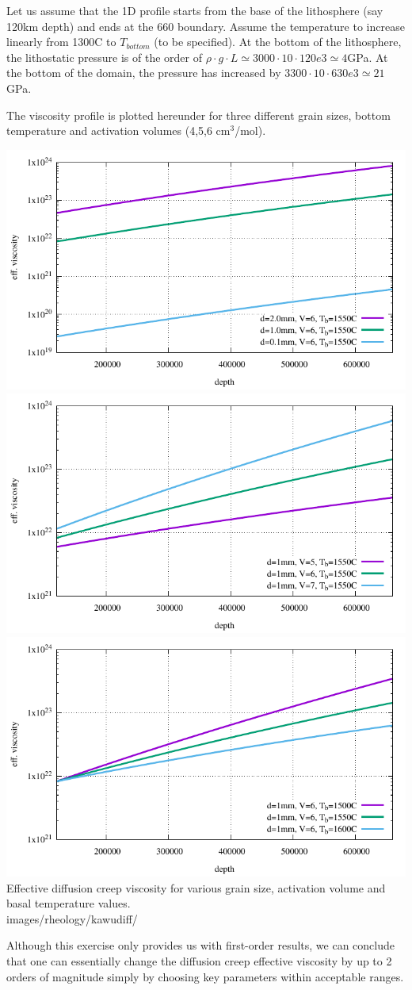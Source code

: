 Let us assume that the 1D profile starts from the base of the lithosphere 
(say 120\si{\km} depth) and ends at the 660 boundary. 
Assume the temperature to increase linearly from 1300\degree C to $T_{bottom}$ (to 
be specified). At the bottom 
of the lithosphere, the lithostatic pressure is of the order of 
$\rho \cdot g \cdot L \simeq 3000\cdot 10 \cdot 120e3 \simeq 4$\si{\giga\pascal}. 
At the bottom of the domain, the pressure has increased 
by $3300\cdot 10 \cdot 630e3 \simeq21$\si{\giga\pascal}. 

The viscosity profile is plotted hereunder for three different grain sizes, bottom temperature and 
activation volumes (4,5,6 cm$^3$/mol). 

\begin{center}
\includegraphics[width=5.cm]{images/rheology/kawudiff/viscosity1.pdf}
\includegraphics[width=5.cm]{images/rheology/kawudiff/viscosity2.pdf}
\includegraphics[width=5.cm]{images/rheology/kawudiff/viscosity3.pdf}\\
{\captionfont Effective diffusion creep viscosity for various 
grain size, activation volume and basal temperature values.}\\
{\color{gray} \tiny {images/rheology/kawudiff/}}
\end{center}

Although this exercise only provides us with first-order results, we can conclude that 
one can essentially change the diffusion creep effective viscosity by up to 2 orders of 
magnitude simply by choosing key parameters within acceptable ranges. 



